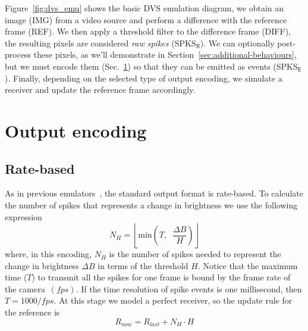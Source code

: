 \documentclass[conference]{IEEEtran}
\begin{document}
Figure~\ref{fig:dvs_emu} shows the basic DVS emulation diagram, we obtain an image (\textsf{IMG}) from a video source and perform a difference with the reference frame (\textsf{REF}). We then apply a threshold filter to the difference frame (\textsf{DIFF}), the resulting pixels are considered \textit{raw spikes} (\textsf{SPKS}$\mathsf{_R}$). We can optionally post-process these pixels, as we'll demonstrate in Section~\ref{sec:additional-behaviours}, but we must encode them (Sec.~\ref{sec:output-modes}) so that they can be emitted as events (\textsf{SPKS}$\mathsf{_E}$). Finally, depending on the selected type of output encoding, we simulate a receiver and update the reference frame accordingly. 


\section{Output encoding}
\label{sec:output-modes}
\subsection{Rate-based}
As in previous emulators~\cite{DVSemu}, the standard output format is rate-based. To calculate the number of spikes that represents a change in brightness we use the following expression
\begin{equation}
  \label{eq:num_spikes_rate}
  N_{H} = \left\lfloor \mathrm{min}\left( T, \;\; \frac{\Delta B}{H} \right) \right\rfloor
\end{equation}
where, in this encoding, $N_{H}$ is the number of spikes needed to represent the change in brightness $\Delta B$ in terms of the threshold $H$. Notice that the maximum time ($T$) to transmit all the spikes for one frame is bound by the frame rate of the camera~$(fps)$. If the time resolution of spike events is one millisecond, then $T = 1000/fps$. At this stage we model a perfect receiver, so the update rule for the reference is
\begin{equation}
  \label{eq:ref_update}
  R_{now} = R_{last} + N_{H}\cdot H
\end{equation}

\end{document}
